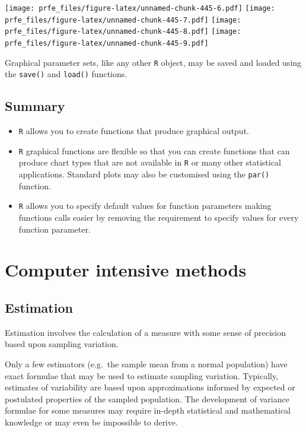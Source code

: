 \documentclass[12pt,a4paper]{book}
\theoremstyle{definition}
\theoremstyle{definition}
\theoremstyle{definition}
\theoremstyle{remark}
\begin{document}
\texttt{[image: prfe\_files/figure-latex/unnamed-chunk-445-6.pdf]}
\texttt{[image: prfe\_files/figure-latex/unnamed-chunk-445-7.pdf]}
\texttt{[image: prfe\_files/figure-latex/unnamed-chunk-445-8.pdf]}
\texttt{[image: prfe\_files/figure-latex/unnamed-chunk-445-9.pdf]}

Graphical parameter sets, like any other \texttt{R} object, may be saved
and loaded using the \texttt{save()} and \texttt{load()} functions.

\hypertarget{summary-7}{%
\section{Summary}\label{summary-7}}

\begin{itemize}
\item
  \texttt{R} allows you to create functions that produce graphical
  output.
\item
  \texttt{R} graphical functions are flexible so that you can create
  functions that can produce chart types that are not available in
  \texttt{R} or many other statistical applications. Standard plots may
  also be customised using the \texttt{par()} function.
\item
  \texttt{R} allows you to specify default values for function
  parameters making functions calls easier by removing the requirement
  to specify values for every function parameter.
\end{itemize}

\hypertarget{exercise9}{%
\chapter{Computer intensive methods}\label{exercise9}}

\hypertarget{estimation}{%
\section{Estimation}\label{estimation}}

Estimation involves the calculation of a measure with some sense of
precision based upon sampling variation.

Only a few estimators (e.g.~the sample mean from a normal population)
have exact formulae that may be used to estimate sampling variation.
Typically, estimates of variability are based upon approximations
informed by expected or postulated properties of the sampled population.
The development of variance formulae for some measures may require
in-depth statistical and mathematical knowledge or may even be
impossible to derive.
\end{document}
